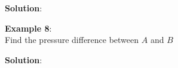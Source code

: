 \documentclass[10pt]{amsart}
\begin{document}
\begin{minipage}[t]{0.5\textwidth}
 \textbf{Solution}:
\end{minipage}
\vspace{3cm}
\begin{minipage}[t]{0.45\textwidth}
 \raggedright
 \textbf{Example 8}:\\
 Find the pressure difference between $A$ and $B$
 \par\vspace{6cm}
\end{minipage}
\hfill
\begin{minipage}[t]{0.5\textwidth}
 \textbf{Solution}:
 \parb
\end{minipage}
\end{document}
